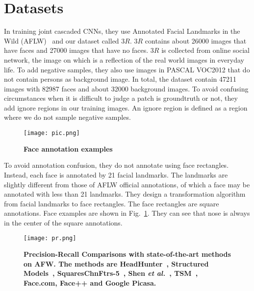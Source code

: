 \documentclass[10pt,twocolumn,letterpaper]{article}
\begin{document}
\section{Datasets}
In training joint cascaded CNNs, they use Annotated Facial Landmarks in the Wild (AFLW)~\cite{name3} and our dataset called 3$R$. 3$R$ contains about 26000 images that have faces and 27000 images that have no faces. 3$R$ is collected from online social network, the image on which is a reflection of the real world images in everyday life. To add negative samples, they also use images in PASCAL VOC2012 that do not contain persons as background image. In total, the dataset contain 47211 images with 82987 faces and about 32000 background images. To avoid confusing circumstances when it is difficult to judge a patch is groundtruth or not, they add ignore regions in our training images. An ignore region is defined as a region where we do not sample negative samples.
\begin{figure}[!htb]
 \centering
 \texttt{[image: pic.png]}\\
 \caption{ \textbf{Face annotation examples}}\label{Figure1}
 \end{figure}
\par To avoid annotation confusion, they do not annotate using face rectangles. Instead, each face is annotated by 21 facial landmarks. The landmarks are slightly different from those of AFLW official annotations, of which a face may be annotated with less than 21 landmarks. They design a transformation algorithm from facial landmarks to face rectangles. The face rectangles are square annotations. Face examples are shown in Fig.~\ref{Figure1}. They can see that nose is always in the center of the square annotations.
\begin{figure}[!htb]
 \centering
 \texttt{[image: pr.png]}\\
 \caption{ \textbf{Precision-Recall Comparisons with state-of-the-art methods on AFW. The methods are HeadHunter~\cite{name18}, Structured Models~\cite{name30}, SquaresChnFtrs-5~\cite{name18}, Shen \emph{et al.}~\cite{name25}, TSM~\cite{name39}, Face.com, Face++ and Google Picasa.}}\label{Figure3}
 \end{figure}
\end{document}
